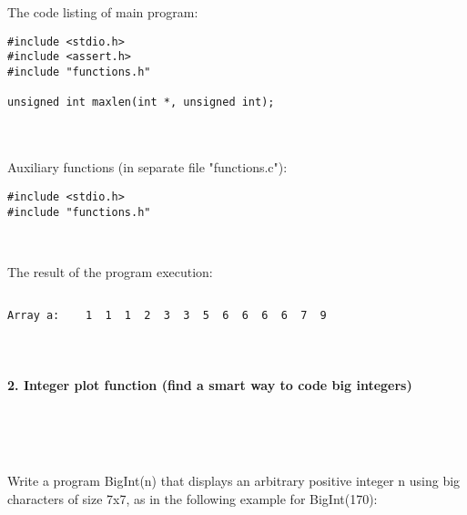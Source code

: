 \documentclass{article}
\begin{document}
\paragraph{}\

		\rmfamily
		\noindent The code listing of main program:
		\begin{verbatim}
#include <stdio.h>
#include <assert.h>
#include "functions.h"

unsigned int maxlen(int *, unsigned int);
		\end{verbatim}


\paragraph{}\

	\rmfamily
	
	Auxiliary functions (in separate file "functions.c"):
	
	\begin{verbatim} 
#include <stdio.h>
#include "functions.h"

\end{verbatim}




	
	\rmfamily\
	
		\noindent The result of the program execution:
		
	\ttfamily
	\begin{lstlisting}[language=bash]

Array a:    1  1  1  2  3  3  5  6  6  6  6  7  9

	\end{lstlisting}
	
	
\paragraph{}\

	
	
	\rmfamily
	
	\paragraph{2. Integer plot function (find a smart way to code big integers) }\
	
	\rmfamily\
	
		Write a program BigInt(n) that displays an arbitrary positive integer n using big characters of size 7x7, as in the following example for BigInt(170):
				
\end{document}
